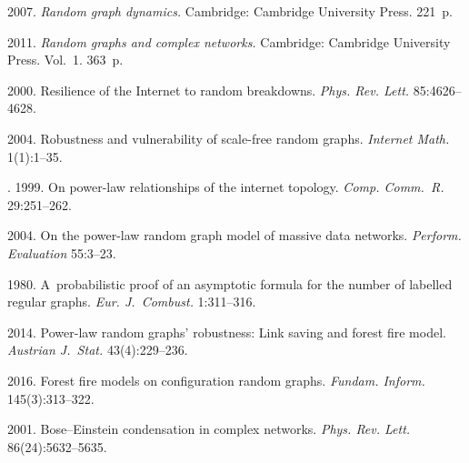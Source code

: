 \pagebreak



  \begin{multicols}{2}

\renewcommand{\bibname}{\protect\rmfamily References}

{\small\frenchspacing
 {%
 \begin{thebibliography}{99}
 
 
 
 2007. \textit{Random graph dynamics.} 
Cambridge: Cambridge University Press. 221~p.

 2011. 
\textit{Random graphs and complex networks.} Cambridge:
Cambridge University Press.  Vol.~1. 363~p.

2000. Resilience of the Internet
to random breakdowns. \textit{Phys. Rev. Lett.} 85:4626--4628.

 2004. Robustness and vulnerability of scale-free
random graphs. \textit{Internet Math.} 1(1):1--35.

. 1999.
 On power-law relationships of
the internet topology. \textit{Comp. Comm.~R.} 29:251--262.

 2004. On the power-law random graph model of massive data
networks. \textit{Perform. Evaluation} 55:3--23.

 1980. A~probabilistic proof of an asymptotic formula for the number
of labelled regular graphs. \textit{Eur. J.~Combust.} 1:311--316.

 2014. 
Power-law random graphs' robustness: Link saving and
forest fire model. \textit{Austrian J.~Stat.} 43(4):229--236.

 2016. Forest fire models on configuration random graphs.
\textit{Fundam. Inform.} 145(3):313--322.

 2001. Bose--Einstein condensation in complex networks.
\textit{Phys. Rev. Lett.} 86(24):5632--5635.


\end{thebibliography}}}
\end{multicols}
